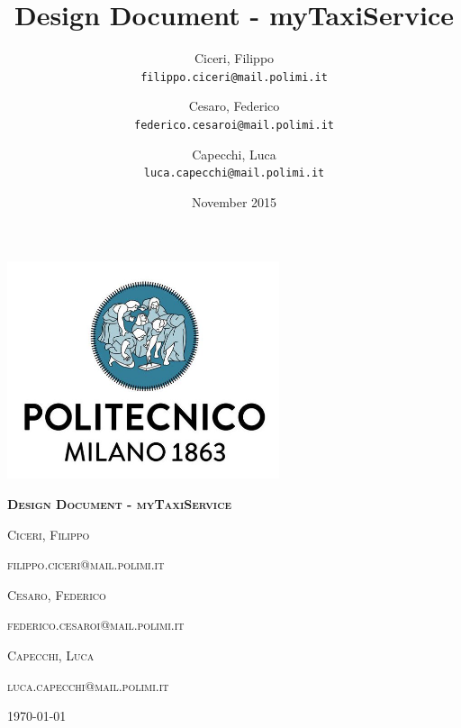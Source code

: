 \documentclass[12pt,a4paper,titlepage]{article}
\title{Design Document - myTaxiService}
\author{
	Ciceri, Filippo \\
	\texttt{filippo.ciceri@mail.polimi.it}
	\and
	Cesaro, Federico \\
	\texttt{federico.cesaroi@mail.polimi.it}
	\and
	Capecchi, Luca \\
	\texttt{luca.capecchi@mail.polimi.it}
}
\date{November 2015}
\begin{document}
\begin{titlepage}
	\centering
	\includegraphics[width=8cm]{../../polimiLogo}\par\vspace{2cm}
	{\scshape\huge\bfseries Design Document - myTaxiService \par}
	\vspace{1.5cm}
	{\scshape\large Ciceri, Filippo \par}
	{\scshape\normalsize filippo.ciceri@mail.polimi.it \par}
	\vspace{0.5cm}
	{\scshape\large Cesaro, Federico \par}
	{\scshape\normalsize federico.cesaroi@mail.polimi.it \par}
	\vspace{0.5cm}
	{\scshape\large Capecchi, Luca \par}
	{\scshape\normalsize luca.capecchi@mail.polimi.it \par}
	\vspace{0.5cm}

	\vfill

	{\large \today\par}
\end{titlepage}
\tableofcontents
\newpage

\newpage


\newpage


\newpage


\newpage


\newpage


\newpage

\end{document}
